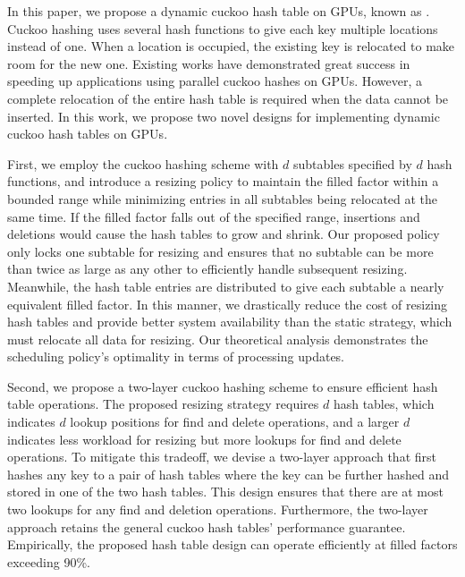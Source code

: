 In this paper, we propose a dynamic cuckoo hash table on GPUs, known as \voter. Cuckoo hashing \cite{pagh2004cuckoo} uses several hash functions to give each key multiple locations instead of one. When a location is occupied, the existing key is relocated to make room for the new one. Existing works \cite{alcantara2009real,alcantara2011building,zhang2015mega,breslow2016horton} have demonstrated great success in speeding up applications using parallel cuckoo hashes on GPUs. 
However, a complete relocation of the entire hash table is required when the data cannot be  inserted.
In this work, we propose two novel designs for implementing dynamic cuckoo hash tables on GPUs.

First, we employ the cuckoo hashing scheme with $d$ subtables specified by $d$ hash functions, and introduce a resizing policy to maintain the filled factor within a bounded range while minimizing entries in all subtables being relocated at the same time. 
If the filled factor falls out of the specified range, insertions and deletions would cause the hash tables to grow and shrink.
Our proposed policy only locks one subtable for resizing and ensures that no subtable can be more than twice as large as any other to efficiently handle subsequent resizing. Meanwhile, the hash table entries are distributed to give each subtable a nearly equivalent filled factor.
In this manner, we drastically reduce the cost of resizing hash tables and provide better system availability than the static strategy, which must relocate all data for resizing.
Our theoretical analysis demonstrates the scheduling policy's optimality in terms of processing updates. 

Second, we propose a two-layer cuckoo hashing scheme to ensure efficient hash table operations. 
The proposed resizing strategy requires $d$ hash tables, which indicates $d$ lookup positions for find and delete operations, and a larger $d$ indicates less workload for resizing but more lookups for find and delete operations. To mitigate this tradeoff, we devise a two-layer approach that first hashes any key to a pair of hash tables where the key can be further hashed and stored in one of the two hash tables.  
This design ensures that there are at most two lookups for any find and deletion operations.
Furthermore, the two-layer approach retains the general cuckoo hash tables' performance guarantee.
Empirically, the proposed hash table design can operate efficiently at filled factors exceeding 90\%.

